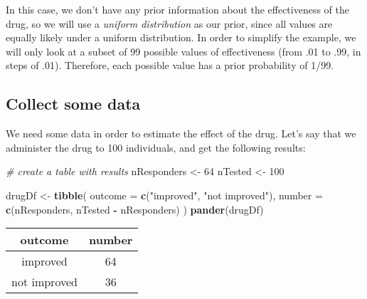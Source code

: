\documentclass[]{book}
\newenvironment{Shaded}{\begin{snugshade}}{\end{snugshade}}
\newcommand{\KeywordTok}[1]{\textcolor[rgb]{0.13,0.29,0.53}{\textbf{#1}}}
\newcommand{\DataTypeTok}[1]{\textcolor[rgb]{0.13,0.29,0.53}{#1}}
\newcommand{\DecValTok}[1]{\textcolor[rgb]{0.00,0.00,0.81}{#1}}
\newcommand{\StringTok}[1]{\textcolor[rgb]{0.31,0.60,0.02}{#1}}
\newcommand{\CommentTok}[1]{\textcolor[rgb]{0.56,0.35,0.01}{\textit{#1}}}
\newcommand{\OperatorTok}[1]{\textcolor[rgb]{0.81,0.36,0.00}{\textbf{#1}}}
\newcommand{\NormalTok}[1]{#1}
\theoremstyle{definition}
\theoremstyle{definition}
\theoremstyle{definition}
\theoremstyle{remark}
\begin{document}
In this case, we don't have any prior information about the
effectiveness of the drug, so we will use a \emph{uniform distribution}
as our prior, since all values are equally likely under a uniform
distribution. In order to simplify the example, we will only look at a
subset of 99 possible values of effectiveness (from .01 to .99, in steps
of .01). Therefore, each possible value has a prior probability of 1/99.

\subsection{Collect some data}\label{collect-some-data-1}

We need some data in order to estimate the effect of the drug. Let's say
that we administer the drug to 100 individuals, and get the following
results:

\begin{Shaded}
\begin{Highlighting}[]
\CommentTok{# create a table with results}
\NormalTok{nResponders <-}\StringTok{ }\DecValTok{64}
\NormalTok{nTested <-}\StringTok{ }\DecValTok{100}

\NormalTok{drugDf <-}\StringTok{ }\KeywordTok{tibble}\NormalTok{(}
  \DataTypeTok{outcome =} \KeywordTok{c}\NormalTok{(}\StringTok{"improved"}\NormalTok{, }\StringTok{"not improved"}\NormalTok{),}
  \DataTypeTok{number =} \KeywordTok{c}\NormalTok{(nResponders, nTested }\OperatorTok{-}\StringTok{ }\NormalTok{nResponders)}
\NormalTok{)}
\KeywordTok{pander}\NormalTok{(drugDf)}
\end{Highlighting}
\end{Shaded}

\begin{longtable}[]{@{}cc@{}}
\toprule
\begin{minipage}[b]{0.20\columnwidth}\centering\strut
outcome\strut
\end{minipage} & \begin{minipage}[b]{0.10\columnwidth}\centering\strut
number\strut
\end{minipage}\tabularnewline
\midrule
\endhead
\begin{minipage}[t]{0.20\columnwidth}\centering\strut
improved\strut
\end{minipage} & \begin{minipage}[t]{0.10\columnwidth}\centering\strut
64\strut
\end{minipage}\tabularnewline
\begin{minipage}[t]{0.20\columnwidth}\centering\strut
not improved\strut
\end{minipage} & \begin{minipage}[t]{0.10\columnwidth}\centering\strut
36\strut
\end{minipage}\tabularnewline
\bottomrule
\end{longtable}
\end{document}
